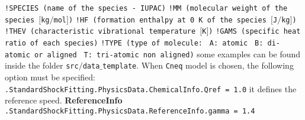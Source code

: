 \documentclass[11pt,a4paper,oneside]{article}
\begin{document}
\hspace*{1.2cm}
\texttt{!SPECIES \hspace*{1.4cm} (name of the species - IUPAC)}
\newline
\hspace*{1.2cm}
\texttt{!MM \hspace*{2.4cm} (molecular weight of the species $[$kg$/$mol$]$)}
\newline
\hspace*{1.2cm}
\texttt{!HF \hspace*{2.4cm} (formation enthalpy at 0 K of the species $[$J$/$kg$]$)}
\newline
\hspace*{1.2cm}
\texttt{!THEV \hspace*{2cm} (characteristic vibrational temperature $[$K$]$)}
\newline
\hspace*{1.2cm}
\texttt{!GAMS \hspace*{2cm} (specific heat ratio of each species)}
\newline
\hspace*{1.2cm}
\texttt{!TYPE \hspace*{2cm} (type of molecule:}
\newline
\texttt{\hspace*{6cm} A: atomic}
\newline
\texttt{\hspace*{6cm} B: di-atomic or aligned}
\newline
\texttt{\hspace*{6cm} T: tri-atomic non aligned)}
\newline
\newline
some examples can be found inside the folder \texttt{src$/$data$\_$template}.
\newline
When \texttt{Cneq} model is chosen, the following option must be specified:
\newline
\newline
\hspace*{1cm} \texttt{.StandardShockFitting.PhysicsData.ChemicalInfo.Qref = 1.0}
\newline
\newline
it defines the reference speed.
\newline
\newline
\textbf{ReferenceInfo}
\newline
\newline
\hspace*{1cm} \texttt{.StandardShockFitting.PhysicsData.ReferenceInfo.gamma = 1.4}
\end{document}
